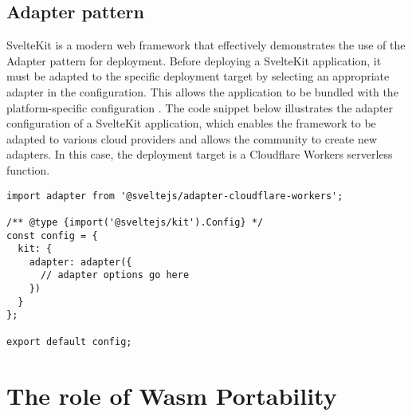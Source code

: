 \subsection{Adapter pattern}
SvelteKit is a modern web framework that effectively demonstrates the use of the Adapter pattern for deployment. Before deploying a SvelteKit application, it must be adapted to the specific deployment target by selecting an appropriate adapter in the configuration. This allows the application to be bundled with the platform-specific configuration \cite{sveltecommunity_2023_adapter}. 
The code snippet below illustrates the adapter configuration of a SvelteKit application, which enables the framework to be adapted to various cloud providers and allows the community to create new adapters. In this case, the deployment target is a Cloudflare Workers \gls{serverless} function.

\begin{lstlisting}[frame=lines, style=ES6, caption={svelte.config.js SvelteKit adapter configuration}, showstringspaces=false, captionpos=b,]
import adapter from '@sveltejs/adapter-cloudflare-workers';
 
/** @type {import('@sveltejs/kit').Config} */
const config = {
  kit: {
    adapter: adapter({
      // adapter options go here
    })
  }
};
 
export default config;
\end{lstlisting}

\section{The role of Wasm Portability}